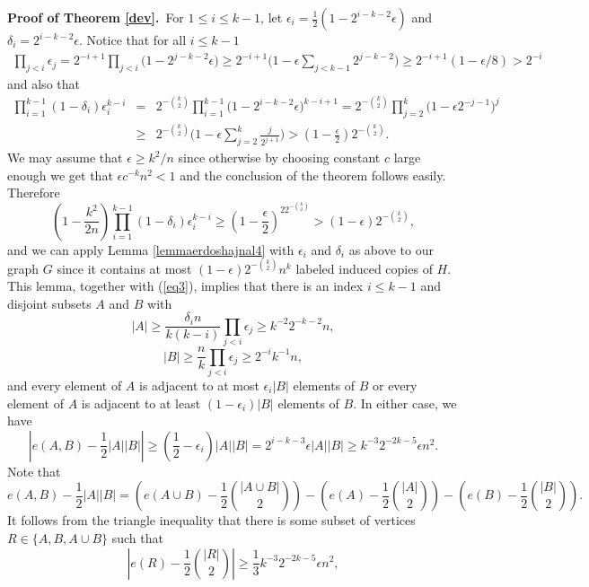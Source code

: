 \documentclass[11pt]{article}
\begin{document}
\vspace{0.25cm}
\noindent
{\bf Proof of Theorem \ref{dev}.}\, For $1 \leq i \leq k-1$, let
$\epsilon_i=\frac{1}{2}(1-2^{i-k-2}\epsilon)$ and
$\delta_i=2^{i-k-2}\epsilon$. Notice that for all $i \leq k-1$
\begin{eqnarray}
\label{eq3}
\prod_{j<i}\epsilon_j=2^{-i+1}\prod_{j<i}\big(1-2^{j-k-2}\epsilon\big)\geq
2^{-i+1}\bigg(1-\epsilon \sum_{j<k-1}2^{j-k-2}\bigg) \geq
2^{-i+1}(1-\epsilon/8)>2^{-i}
\end{eqnarray}
and also that
\begin{eqnarray*}
\prod_{i=1}^{k-1}(1-\delta_i)\epsilon_i^{k-i}&=&
2^{-{k \choose 2}}\prod_{i=1}^{k-1}\big(1-2^{i-k-2}\epsilon \big)^{k-i+1}=
2^{-{k \choose
2}}\prod_{j=2}^{k} \big(1-\epsilon2^{-j-1}\big)^{j}\\ &\geq&
2^{-{k \choose 2}}\bigg(1-\epsilon\sum_{j=2}^k \frac{j}{2^{j+1}}\bigg)
>
\left(1-\frac{\epsilon}{2}\right)2^{-{k \choose 2}}.
\end{eqnarray*}
We may assume that $\epsilon \geq k^2/n$ since otherwise
by choosing constant $c$ large enough we get that $\epsilon c^{-k}n^2<1$ and the conclusion of the
theorem follows easily. Therefore
$$ \left(1-\frac{k^2}{2n}\right)\prod_{i=1}^{k-1} (1-\delta_i)\epsilon_i^{k-i} \geq
\left(1-\frac{\epsilon}{2}\right)^22^{-{k \choose 2}} >
(1-\epsilon)2^{-{k \choose 2}},$$ and we can apply Lemma
\ref{lemmaerdoshajnal4} with $\epsilon_i$ and $\delta_i$ as above to
our graph $G$ since it contains at most $(1-\epsilon)2^{-{k \choose
2}}n^k$ labeled induced copies of $H$.  This lemma, together with
(\ref{eq3}), implies that there is an index $i \leq k-1$ and
disjoint subsets $A$ and $B$ with
$$|A|\geq \frac{\delta_in}{k(k-i)}\prod_{j<i} \epsilon_j \geq k^{-2}2^{-k-2}n,$$ $$|B|
\geq \frac{n}{k}\prod_{j < i} \epsilon_j \geq 2^{-i}k^{-1}n,$$ and
every element of $A$ is adjacent to at most $\epsilon_i|B|$ elements
of $B$ or every element of $A$ is adjacent to at least
$(1-\epsilon_i)|B|$ elements of $B$. In either case, we have
$$\left|e(A,B)-\frac{1}{2}|A||B|\right| \geq
\left(\frac{1}{2}-\epsilon_i\right)|A||B|=2^{i-k-3}\epsilon|A||B| \geq k^{-3}2^{-2k-5}\epsilon n^2.$$
Note that
$$e(A,B)-\frac{1}{2}|A||B|=\left(e(A \cup B)-\frac{1}{2}{|A \cup B|
\choose 2}\right)-\left(e(A)-\frac{1}{2}{|A| \choose
2}\right)-\left(e(B)-\frac{1}{2}{|B| \choose 2}\right).$$ It follows
from the triangle inequality that there is some subset of vertices
$R \in \{A,B, A \cup B\}$ such that
\begin{equation}
\label{subset}
\left|e(R)-\frac{1}{2}{|R| \choose 2}\right| \geq
\frac{1}{3} k^{-3}2^{-2k-5}\epsilon n^2,
\end{equation}
\end{document}
